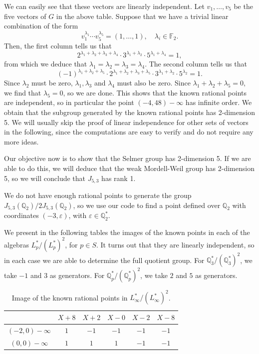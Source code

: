 \documentclass[a4paper, 12pt]{amsart}
\theoremstyle{definition}
\theoremstyle{plain}
\theoremstyle{plain}
\theoremstyle{plain}
\theoremstyle{plain}
\theoremstyle{remark}
\theoremstyle{remark}
\theoremstyle{plain}
\newcommand{\Q}{\mathbb{Q}}
\newcommand{\GF}[1]{\mathbb{F}_{#1}}
\begin{document}
	We can easily see that these vectors are linearly independent. Let $v_1,\ldots,v_5$ be the five vectors of $G$ in the above table. Suppose that we have a trivial linear combination of the form
	\begin{equation*}
		v_1^{\lambda_1}\cdots v_5^{\lambda_5}=(1,\ldots,1), \quad\lambda_i\in\GF{2}.
	\end{equation*}
	Then, the first column tells us that
	\begin{equation*}
		2^{\lambda_1+\lambda_2+\lambda_3+\lambda_4}\cdot 3^{\lambda_1+\lambda_2}\cdot 5^{\lambda_1+\lambda_4}=1,
	\end{equation*}
	from which we deduce that $\lambda_1=\lambda_2=\lambda_3=\lambda_4$.
	The second column tells us that
	\begin{equation*}
		(-1)^{\lambda_1+\lambda_2+\lambda_5}\cdot2^{\lambda_1+\lambda_2+\lambda_3+\lambda_5}\cdot 3^{\lambda_1+\lambda_2}\cdot 5^{\lambda_2}=1.
	\end{equation*}
	Since $\lambda_2$ must be zero, $\lambda_1,\lambda_3$ and $\lambda_4$ must also be zero. Since $\lambda_1+\lambda_2+\lambda_5=0$, we find that $\lambda_5=0$, so we are done. This shows that the known rational points are independent, so in particular the point $(-4,48)-\infty$ has infinite order. We obtain that the subgroup generated by the known rational points has 2-dimension 5. We will usually skip the proof of linear independence for other sets of vectors in the following, since the computations are easy to verify and do not require any more ideas.
	
	Our objective now is to show that the Selmer group has 2-dimension 5. If we are able to do this, we will deduce that the weak Mordell-Weil group has 2-dimension 5, so we will conclude that $J_{5,3}$ has rank 1.

	We do not have enough rational points to generate the group $J_{5,3}(\Q_2)/2J_{5,3}(\Q_2)$, so we use our code to find a point defined over $\Q_2$ with coordinates $(-3,\varepsilon)$, with $\varepsilon\in\Q_2^*$.
	
	We present in the following tables the images of the known points in each of the algebras $L_p^*/(L_p^*)^2$, for $p\in S$. It turns out that they are linearly independent, so in each case we are able to determine the full quotient group. For $\Q_3^*/(\Q_3^*)^2$, we take $-1$ and $3$ as generators. For $\Q_p^*/(\Q_p^*)^2$, we take $2$ and $5$ as generators.
	
	\begin{table}[h!]
		\begin{center}
	\begin{tabular}{c|c|c|c|c|c}
		& $X+8$ & $X+2$ & $X-0$ & $X-2$ & $X-8$\\ \hline
		$(-2,0)-\infty$&$1$ & $-1$ & $-1$ & $-1$ & $-1$\\ \hline
		$(0,0)-\infty$&$1$ & $1$ & $1$ & $-1$ & $-1$\\ \hline
	\end{tabular}
	\vspace{10pt}
	\caption{Image of the known rational points in $L_\infty^*/(L_\infty^*)^2$.}
	\label{tableinfinity}
	\end{center}
\end{table}
	
\end{document}

